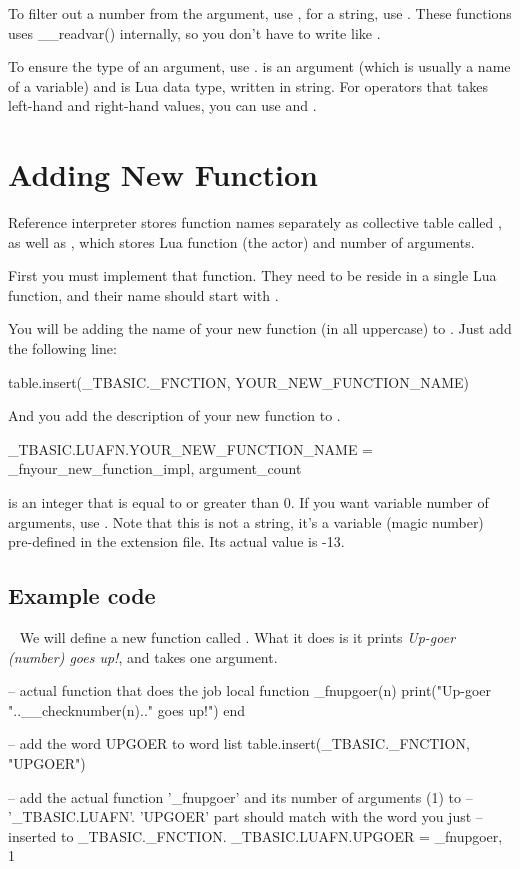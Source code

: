 To filter out a number from the argument, use , for a string, use . These functions uses __readvar() internally, so you don't have to write like .

To ensure the type of an argument, use .  is an argument (which is usually a name of a variable) and  is Lua data type, written in string. For operators that takes left-hand and right-hand values, you can use  and .

\section{Adding New Function}

Reference interpreter stores function names separately as collective table called , as well as , which stores Lua function (the actor) and number of arguments.

First you must implement that function. They need to be reside in a single Lua function, and their name should start with .

You will be adding the name of your new function (in all uppercase) to . Just add the following line:

\begin{codeblock}
table.insert(_TBASIC._FNCTION, YOUR_NEW_FUNCTION_NAME)
\end{codeblock}

And you add the description of your new function to .

\begin{codeblock}
_TBASIC.LUAFN.YOUR_NEW_FUNCTION_NAME = {_fnyour_new_function_impl, argument_count}
\end{codeblock}

 is an integer that is equal to or greater than 0. If you want variable number of arguments, use . Note that this is not a string, it's a variable (magic number) pre-defined in the extension file. Its actual value is -13.

\subsection{Example code}
~
We will define a new function called . What it does is it prints \emph{Up-goer (number) goes up!}, and takes one argument.

\begin{codeblock}
-- actual function that does the job
local function _fnupgoer(n)
	print("Up-goer "..__checknumber(n).." goes up!")
end

-- add the word UPGOER to word list
table.insert(_TBASIC._FNCTION, "UPGOER")

-- add the actual function '_fnupgoer' and its number of arguments (1) to
-- '_TBASIC.LUAFN'.  'UPGOER' part should match with the word you just
-- inserted to _TBASIC._FNCTION.
_TBASIC.LUAFN.UPGOER = {_fnupgoer, 1}
\end{codeblock}
